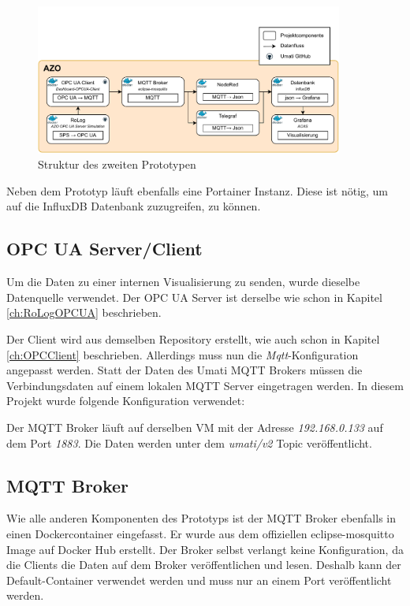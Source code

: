 \documentclass[a4paper, 12pt, oneside, toc=listofnumbered, bibliography=totoc]{scrbook}
\begin{document}
		\begin{figure}[H]
			\centering
			\includegraphics[width=0.9\textwidth]{res/implementierung/Prototyp-Prototyp.pdf}
			\caption{Struktur des zweiten Prototypen}
			\label{fig:Prototyp2}
		\end{figure}
		
		Neben dem Prototyp läuft ebenfalls eine Portainer Instanz. Diese ist nötig, um auf die InfluxDB Datenbank zuzugreifen, zu können. 
		
		\subsection{OPC UA Server/Client}
		
		Um die Daten zu einer internen Visualisierung zu senden, wurde dieselbe Datenquelle verwendet. Der OPC UA Server ist derselbe wie schon in Kapitel \ref{ch:RoLogOPCUA} beschrieben. 
		
		Der Client wird aus demselben Repository erstellt, wie auch schon in Kapitel \ref{ch:OPCClient} beschrieben. Allerdings muss nun die \textit{Mqtt}-Konfiguration angepasst werden. Statt der Daten des Umati MQTT Brokers müssen die Verbindungsdaten auf einem lokalen MQTT Server eingetragen werden. In diesem Projekt wurde folgende Konfiguration verwendet:
		
		
		
		Der MQTT Broker läuft auf derselben VM mit der Adresse \textit{192.168.0.133} auf dem Port \textit{1883}. Die Daten werden unter dem \textit{umati/v2} Topic veröffentlicht. 
		
		\subsection{MQTT Broker}\label{ch:MQTT Broker}
		
		Wie alle anderen Komponenten des Prototyps ist der MQTT Broker ebenfalls in einen Dockercontainer eingefasst. Er wurde aus dem offiziellen eclipse-mosquitto Image auf Docker Hub erstellt. Der Broker selbst verlangt keine Konfiguration, da die Clients die Daten auf dem Broker veröffentlichen und lesen. Deshalb kann der Default-Container verwendet werden und muss nur an einem Port veröffentlicht werden.
		
\end{document}
